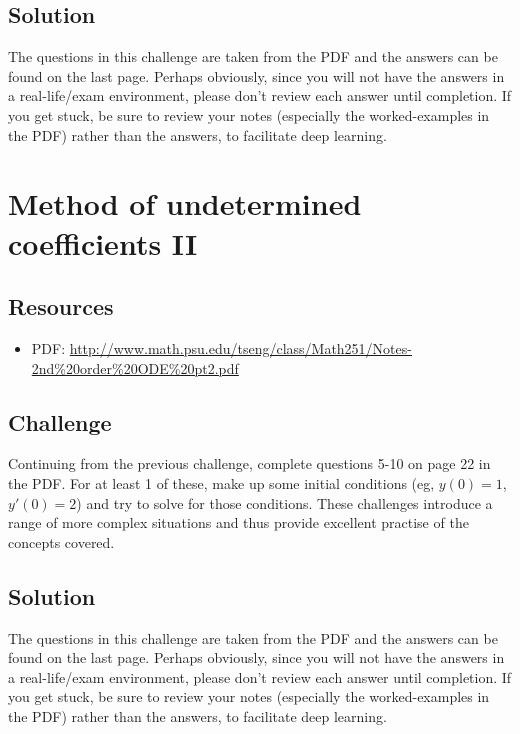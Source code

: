 \subsection*{Solution}
The questions in this challenge are taken from the PDF and the answers can be found on the last page. Perhaps obviously, since you will not have the answers in a real-life/exam environment, please don't review each answer until completion. If you get stuck, be sure to review your notes (especially the worked-examples in the PDF) rather than the answers, to facilitate deep learning. 




\newpage
\section{Method of undetermined coefficients II}

\subsection*{Resources}
\begin{itemize}
    \item PDF: \url{http://www.math.psu.edu/tseng/class/Math251/Notes-2nd\%20order\%20ODE\%20pt2.pdf}
\end{itemize}

\subsection*{Challenge}
Continuing from the previous challenge, complete questions 5-10 on page 22 in the PDF. For at least 1 of these, make up some initial conditions (eg, $y(0)=1$, $y'(0)=2$) and try to solve for those conditions. These challenges introduce a range of more complex situations and thus provide excellent practise of the concepts covered. 

\subsection*{Solution}
The questions in this challenge are taken from the PDF and the answers can be found on the last page. Perhaps obviously, since you will not have the answers in a real-life/exam environment, please don't review each answer until completion. If you get stuck, be sure to review your notes (especially the worked-examples in the PDF) rather than the answers, to facilitate deep learning. 




